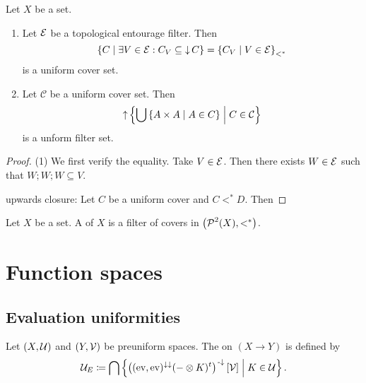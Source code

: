 \begin{proposition}
Let $X$ be a set.
\begin{enumerate}
\item Let $\operatorname{\mathcal{E}}$ be a topological entourage filter. Then
\[ \left\{ C \;\middle|\; \exists V\in\operatorname{\mathcal{E}}: C_V\subseteq \operatorname{\downarrow} C \right\} = \left\{ C_V \;\middle|\; V\in\operatorname{\mathcal{E}} \right\}_{<^*} \]
is a uniform cover set.
\item Let $\mathcal{C}$ be a uniform cover set. Then
\[ \operatorname{\uparrow} \left\{ \bigcup\left\{ A\times A \;\middle|\; A\in C \right\} \;\middle|\; C\in\mathcal{C} \right\} \]
is a unform filter set.
\end{enumerate}
\end{proposition}
\begin{proof}
(1) We first verify the equality. Take $V\in \operatorname{\mathcal{E}}$. Then there exists $W\in \operatorname{\mathcal{E}}$ such that $W;W;W\subseteq V$.


upwards closure: Let $C$ be a uniform cover and $C <^* D$. Then 
\end{proof}



\begin{definition}
Let $X$ be a set. A  of $X$ is a filter of covers in $\left( \operatorname{\mathcal{P}}^2(X), <^* \right)$.
\end{definition}

\section{Function spaces}
\subsection{Evaluation uniformities}
\begin{definition}
Let $\left( X, \mathcal{U} \right)$ and $\left( Y,\mathcal{V} \right)$ be preuniform spaces. The  on $(X\to Y)$ is defined by
\[ \mathcal{U}_E \coloneqq \bigcap \left\{ \left((\operatorname{ev}, \operatorname{ev})^{\downarrow\downarrow}(-\otimes K)^t\right)^{{\text{\hspace{0.15em}-}\downarrow}}[\mathcal{V}]  \;\middle|\; K\in\mathcal{U} \right\}. \]
\end{definition}

